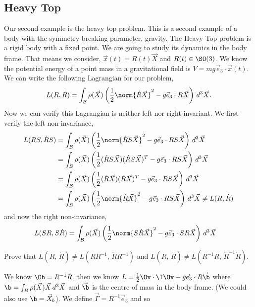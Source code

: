 
\subsection{Heavy Top}

Our second example is the heavy top problem. This is a second example of a body with the symmetry breaking parameter, gravity. The Heavy Top problem is a rigid body with a fixed point. We are going to study its dynamics in the body frame. That means we consider, $\vec x(t) = R(t)\vec X$ and $R(t) \in \SO(3)$. We know the potential energy of a point mass in a gravitational field is $V = mg\vec e_3 \cdot \vec x(t)$. We can write the following Lagrangian for our problem,
$$ L(R, \dot R) = \int_\mathcal{B} \rho(\vec X) \left( \frac{1}{2}\norm{\dot R \vec X}^2 - g\vec e_3 \cdot R\vec X \right)\,d^3\vec X. $$
\noindent
Now we can verify this Lagrangian is neither left nor right invariant. We first verify the left non-invariance,
\begin{align*}
  L(RS, \dot RS) &= \int_\mathcal{B} \rho(\vec X) \left( \frac{1}{2}\norm{\dot RS \vec X}^2 - g\vec e_3 \cdot RS\vec X \right)\,d^3\vec X\\
  &= \int_\mathcal{B} \rho(\vec X) \left( \frac{1}{2}{(\dot RS \vec X)(\dot RS \vec X)^T} - g\vec e_3 \cdot RS\vec X \right)\,d^3\vec X\\
  &= \int_\mathcal{B} \rho(\vec X) \left( \frac{1}{2}{(\dot R \vec X)(\dot R \vec X)^T} - g\vec e_3 \cdot RS\vec X \right)\,d^3\vec X \\
  &= \int_\mathcal{B} \rho(\vec X) \left( \frac{1}{2}\norm{\dot R \vec X}^2 - g\vec e_3 \cdot RS\vec X \right)\,d^3\vec X \ne L(R, \dot R)
\end{align*}
and now the right non-invariance,
\begin{align*}
  L(SR, S\dot R) &= \int_\mathcal{B} \rho(\vec X) \left( \frac{1}{2}\norm{S\dot R \vec X}^2 - g\vec e_3 \cdot SR\vec X \right)\,d^3\vec X
\end{align*}
\begin{exercise}
  Prove that $L(R,\,\dot R) \ne L(RR^{-1},\,\dot RR^{-1})$ and $L(R,\,\dot R) \ne L(R^{-1}R,\,\dot R^{-1}\dot R)$.
\end{exercise}
We know $\Oh = R^{-1}\dot R$, then we know $L = \frac{1}{2}\Ov \cdot \I\Ov - g\vec e_3 \cdot R\vec\b$ where $\b = \int_B \rho(\vec X)\vec X\, d^3\vec X$ and $\vec \b$ is the centre of mass in the body frame. (We could also use $\b = \vec X_b$). We define $\vec\Gamma = R^{-1}\vec e_3$
and so
